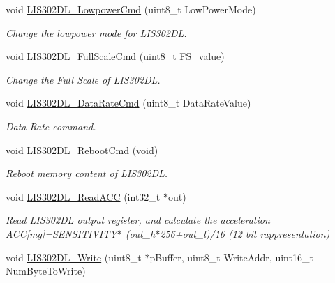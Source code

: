 \begin{DoxyCompactItemize}
void \hyperlink{group___s_t_m32_f4___d_i_s_c_o_v_e_r_y___l_i_s302_d_l___exported___functions_ga445e78cca4cd65f59e0ffaa3575db8ae}{L\-I\-S302\-D\-L\-\_\-\-Lowpower\-Cmd} (uint8\-\_\-t Low\-Power\-Mode)
\begin{DoxyCompactList}\small\item\em Change the lowpower mode for L\-I\-S302\-D\-L. \end{DoxyCompactList}\item 
void \hyperlink{group___s_t_m32_f4___d_i_s_c_o_v_e_r_y___l_i_s302_d_l___exported___functions_gadb44926aefe4fc8e6cdff256077c0bf4}{L\-I\-S302\-D\-L\-\_\-\-Full\-Scale\-Cmd} (uint8\-\_\-t F\-S\-\_\-value)
\begin{DoxyCompactList}\small\item\em Change the Full Scale of L\-I\-S302\-D\-L. \end{DoxyCompactList}\item 
void \hyperlink{group___s_t_m32_f4___d_i_s_c_o_v_e_r_y___l_i_s302_d_l___exported___functions_ga8542910cb1e71d7031fab7a462c768bd}{L\-I\-S302\-D\-L\-\_\-\-Data\-Rate\-Cmd} (uint8\-\_\-t Data\-Rate\-Value)
\begin{DoxyCompactList}\small\item\em Data Rate command. \end{DoxyCompactList}\item 
void \hyperlink{group___s_t_m32_f4___d_i_s_c_o_v_e_r_y___l_i_s302_d_l___exported___functions_ga34234db89f7d653fea3085007d3d9e0e}{L\-I\-S302\-D\-L\-\_\-\-Reboot\-Cmd} (void)
\begin{DoxyCompactList}\small\item\em Reboot memory content of L\-I\-S302\-D\-L. \end{DoxyCompactList}\item 
void \hyperlink{group___s_t_m32_f4___d_i_s_c_o_v_e_r_y___l_i_s302_d_l___exported___functions_gaf31f5b65ff8d208eeabae1a8f294fcc2}{L\-I\-S302\-D\-L\-\_\-\-Read\-A\-C\-C} (int32\-\_\-t $\ast$out)
\begin{DoxyCompactList}\small\item\em Read L\-I\-S302\-D\-L output register, and calculate the acceleration A\-C\-C\mbox{[}mg\mbox{]}=S\-E\-N\-S\-I\-T\-I\-V\-I\-T\-Y$\ast$ (out\-\_\-h$\ast$256+out\-\_\-l)/16 (12 bit rappresentation) \end{DoxyCompactList}\item 
void \hyperlink{group___s_t_m32_f4___d_i_s_c_o_v_e_r_y___l_i_s302_d_l___exported___functions_ga43f400565c47cdcf5fd19b8b601e7c41}{L\-I\-S302\-D\-L\-\_\-\-Write} (uint8\-\_\-t $\ast$p\-Buffer, uint8\-\_\-t Write\-Addr, uint16\-\_\-t Num\-Byte\-To\-Write)

\end{DoxyCompactItemize}
